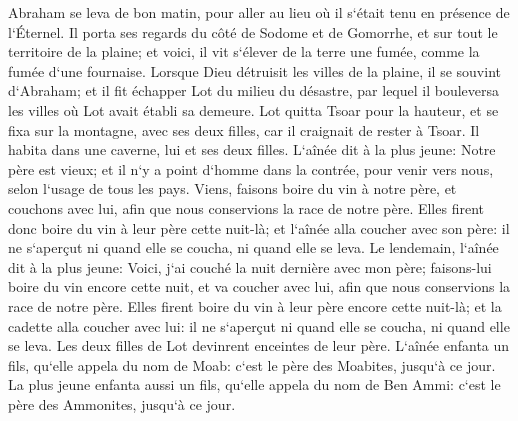 \verse Abraham se leva de bon matin, pour aller au lieu où il s`était tenu en présence de l`Éternel. 
\verse Il porta ses regards du côté de Sodome et de Gomorrhe, et sur tout le territoire de la plaine; et voici, il vit s`élever de la terre une fumée, comme la fumée d`une fournaise. 
\verse Lorsque Dieu détruisit les villes de la plaine, il se souvint d`Abraham; et il fit échapper Lot du milieu du désastre, par lequel il bouleversa les villes où Lot avait établi sa demeure. 
\verse Lot quitta Tsoar pour la hauteur, et se fixa sur la montagne, avec ses deux filles, car il craignait de rester à Tsoar. Il habita dans une caverne, lui et ses deux filles. 
\verse L`aînée dit à la plus jeune: Notre père est vieux; et il n`y a point d`homme dans la contrée, pour venir vers nous, selon l`usage de tous les pays. 
\verse Viens, faisons boire du vin à notre père, et couchons avec lui, afin que nous conservions la race de notre père. 
\verse Elles firent donc boire du vin à leur père cette nuit-là; et l`aînée alla coucher avec son père: il ne s`aperçut ni quand elle se coucha, ni quand elle se leva. 
\verse Le lendemain, l`aînée dit à la plus jeune: Voici, j`ai couché la nuit dernière avec mon père; faisons-lui boire du vin encore cette nuit, et va coucher avec lui, afin que nous conservions la race de notre père. 
\verse Elles firent boire du vin à leur père encore cette nuit-là; et la cadette alla coucher avec lui: il ne s`aperçut ni quand elle se coucha, ni quand elle se leva. 
\verse Les deux filles de Lot devinrent enceintes de leur père. 
\verse L`aînée enfanta un fils, qu`elle appela du nom de Moab: c`est le père des Moabites, jusqu`à ce jour. 
\verse La plus jeune enfanta aussi un fils, qu`elle appela du nom de Ben Ammi: c`est le père des Ammonites, jusqu`à ce jour. 

